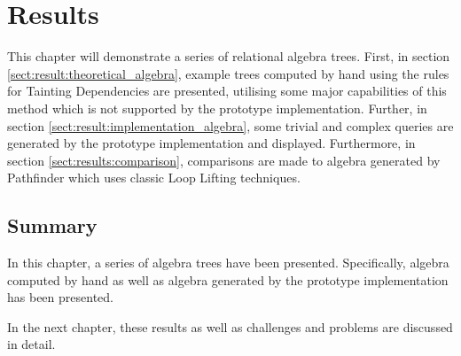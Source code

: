 \chapter{Results}
\label{chapter:results}
This chapter will demonstrate a series of relational algebra trees. First, in
section \ref{sect:result:theoretical_algebra}, example trees computed by hand
using the rules for Tainting Dependencies are presented, utilising
some major capabilities of this method which is not supported by the prototype
implementation. Further, in section \ref{sect:result:implementation_algebra},
some trivial and complex queries are generated by the prototype implementation
and displayed. Furthermore, in section \ref{sect:results:comparison},
comparisons are made to algebra generated by Pathfinder which uses classic
Loop Lifting techniques.




\section{Summary}
\label{sect:res:summary}
In this chapter, a series of algebra trees have been presented. Specifically,
algebra computed by hand as well as algebra generated by the prototype
implementation has been presented. 

In the next chapter, these results as well as challenges and problems are
discussed in detail.
